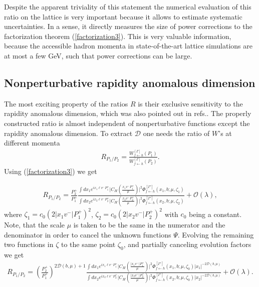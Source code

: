 \documentclass[a4paper, amsfonts, amssymb, amsmath, reprint, showkeys, nofootinbib, twoside]{revtex4-1}
\newcommand{\Ds}{\displaystyle}
\newcommand{\ot}{\leftarrow}
\renewcommand{\(}{\left(}
\renewcommand{\)}{\right)}
\renewcommand{\[}{\left[}
\renewcommand{\]}{\right]}
\begin{document}
Despite the apparent triviality of this statement the numerical evaluation of this ratio on the lattice
is very important because it allows to estimate systematic uncertainties. In a sense, it directly measures the size of power corrections to the factorization theorem (\ref{factorization3}). This is very valuable information, because the accessible hadron momenta in state-of-the-art lattice simulations are at most a few GeV, such that power corrections can be large.

\subsection{Nonperturbative rapidity anomalous dimension}

The most exciting property of the ratios $R$ is their exclusive sensitivity to the rapidity anomalous dimension, which was also pointed out in refs.\cite{Ebert:2018gzl,Ebert:2019tvc,Ji:2019ewn}. The properly constructed ratio is almost independent of nonperturbative functions except the rapidity anomalous dimension. To extract $\mathcal{D}$ one needs the ratio of $W$'s at different momenta
\begin{eqnarray}
R_{P_1/P_2}=\frac{W_{f\ot h}^{[\Gamma]}(P_1)}{W_{f\ot h}^{[\Gamma]}(P_2)}.
\end{eqnarray}
Using (\ref{factorization3}) we get
\begin{widetext}
\begin{eqnarray}
R_{P_1/P_2}=\frac{P_2^+}{P_1^+}
\frac{\Ds\int dx_1 e^{ix_1\ell v^-P_1^+}\Big|C_H\(\frac{x_1 v^-P_1^+}{\mu}\)\Big|^2 \Phi_{f\ot h}^{[\Gamma']}(x_1,b;\mu,\zeta_1)}{\Ds\int dx_2 e^{ix_2\ell v^-P_2^+}\Big|C_H\(\frac{x_2 v^-P_2^+}{\mu}\)\Big|^2 \Phi^{[\Gamma']}_{f\ot h}(x_2,b;\mu,\zeta_2)}+\mathcal{O}(\lambda),
\end{eqnarray}
where $\zeta_1=c_0(2|x_1v^-|P_1^+)^2 $, $\zeta_2=c_0(2|x_2v^-|P^+_2)^2 $ with $c_0$ being a constant. Note, that the scale $\mu$ is taken to be the same in the numerator and the denominator in order to cancel the unknown functions $\Psi$. Evolving the remaining two functions in $\zeta$ to the same point $\zeta_0$, and partially canceling evolution factors we get
\begin{eqnarray}\label{ratio1}
R_{P_1/P_2}=\(\frac{P_2^+}{P_1^+}\)^{2\mathcal{D}(b,\mu)+1}\frac{
\Ds\int dx_1 e^{ix_1\ell v^-P_1^+}\Big|C_H\(\frac{|x_1 v^-|P_1^+}{\mu}\)\Big|^2 \Phi^{[\Gamma']}_{f\ot h}(x_1,b;\mu,\zeta_0)
|x_1|^{-2\mathcal{D}(b,\mu)}}{\Ds\int dx_2 e^{ix_2\ell v^-P_2^+}\Big|C_H\(\frac{|x_2 v^-|P_2^+}{\mu}\)\Big|^2 \Phi^{[\Gamma']}_{f\ot h}(x_2,b;\mu,\zeta_0)
|x_2|^{-2\mathcal{D}(b,\mu)}}+\mathcal{O}(\lambda).
\end{eqnarray}
\end{widetext}
\end{document}
